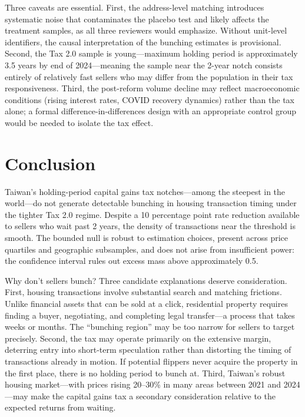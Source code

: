 \documentclass[12pt]{article}
\begin{document}
Three caveats are essential. First, the address-level matching introduces systematic noise that contaminates the placebo test and likely affects the treatment samples, as all three reviewers would emphasize. Without unit-level identifiers, the causal interpretation of the bunching estimates is provisional. Second, the Tax 2.0 sample is young---maximum holding period is approximately 3.5 years by end of 2024---meaning the sample near the 2-year notch consists entirely of relatively fast sellers who may differ from the population in their tax responsiveness. Third, the post-reform volume decline may reflect macroeconomic conditions (rising interest rates, COVID recovery dynamics) rather than the tax alone; a formal difference-in-differences design with an appropriate control group would be needed to isolate the tax effect.


\section{Conclusion}

Taiwan's holding-period capital gains tax notches---among the steepest in the world---do not generate detectable bunching in housing transaction timing under the tighter Tax 2.0 regime. Despite a 10 percentage point rate reduction available to sellers who wait past 2 years, the density of transactions near the threshold is smooth. The bounded null is robust to estimation choices, present across price quartiles and geographic subsamples, and does not arise from insufficient power: the confidence interval rules out excess mass above approximately 0.5.

Why don't sellers bunch? Three candidate explanations deserve consideration. First, housing transactions involve substantial search and matching frictions. Unlike financial assets that can be sold at a click, residential property requires finding a buyer, negotiating, and completing legal transfer---a process that takes weeks or months. The ``bunching region'' may be too narrow for sellers to target precisely. Second, the tax may operate primarily on the extensive margin, deterring entry into short-term speculation rather than distorting the timing of transactions already in motion. If potential flippers never acquire the property in the first place, there is no holding period to bunch at. Third, Taiwan's robust housing market---with prices rising 20--30\% in many areas between 2021 and 2024---may make the capital gains tax a secondary consideration relative to the expected returns from waiting.
\end{document}
